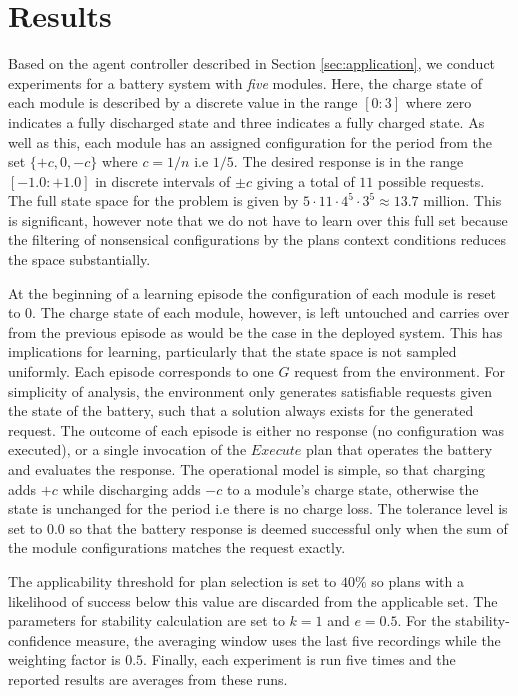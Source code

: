 \section{Results}\label{sec:results}

Based on the agent controller described in Section \ref{sec:application}, we conduct experiments for a battery system with {\em five} modules. Here, the charge state of each module is described by a discrete value in the range $[0:3]$ where zero indicates a fully discharged state and three indicates a fully charged state. As well as this, each module has an assigned configuration for the period from the set $\{+c, 0, -c\}$ where $c=1/n$ i.e $1/5$. The desired response is in the range $[-1.0:+1.0]$ in discrete intervals of $\pm c$ giving a total of $11$ possible requests. The full state space for the problem is given by $5 \cdot 11 \cdot 4^5 \cdot 3^5 \approx 13.7$ million. This is significant, however note that we do not have to learn over this full set because the filtering of nonsensical configurations by the plans context conditions reduces the space substantially.

At the beginning of a learning episode the configuration of each module is reset to $0$. The charge state of each module, however, is left untouched and carries over from the previous episode as would be the case in the deployed system. This has implications for learning, particularly that the state space is not sampled uniformly. Each episode corresponds to one $G$ request from the environment. For simplicity of analysis, the environment only generates satisfiable requests given the state of the battery, such that a solution always exists for the generated request. The outcome of each episode is either no response (no configuration was executed), or a single invocation of the $Execute$ plan that operates the battery and evaluates the response. The operational model is simple, so that charging adds $+c$ while discharging adds $-c$ to a module's charge state, otherwise the state is unchanged for the period i.e there is no charge loss. The tolerance level is set to $0.0$ so that the battery response is deemed successful only when the sum of the module configurations matches the request exactly.

The applicability threshold for plan selection is set to $40\%$ so plans with a likelihood of success below this value are discarded from the applicable set. The parameters for stability calculation are set to $k=1$ and $e=0.5$. For the stability-confidence measure, the averaging window uses the last five recordings while the weighting factor is $0.5$. Finally, each experiment is run five times and the reported results are averages from these runs.

